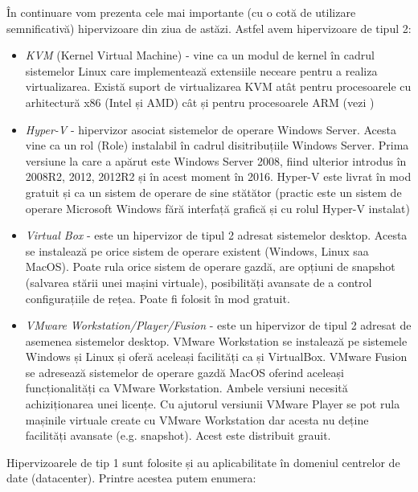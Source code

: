 În continuare vom prezenta cele mai importante (cu o cotă de utilizare
semnificativă) hipervizoare din ziua de astăzi. Astfel avem hipervizoare de
tipul 2:

\begin{itemize}
	\item \textit{KVM} (Kernel Virtual Machine) - vine ca un modul de kernel
		în cadrul sistemelor Linux care implementează extensiile neceare
		pentru a realiza virtualizarea. Există suport de virtualizarea
		KVM atât pentru procesoarele cu arhitectură x86 (Intel și AMD)
		cât și pentru procesoarele ARM (vezi
		)
	\item \textit{Hyper-V} - hipervizor asociat sistemelor de operare
		Windows Server. Acesta vine ca un rol (Role) instalabil în
		cadrul disitribuțiile Windows Server. Prima versiune la care a
		apărut este Windows Server 2008, fiind ulterior introdus în
		2008R2, 2012, 2012R2 și în acest moment în 2016. Hyper-V este
		livrat în mod gratuit și ca un sistem de operare de sine
		stătător (practic este un sistem de operare Microsoft Windows
		fără interfață grafică și cu rolul Hyper-V instalat)
	\item \textit{Virtual Box} - este un hipervizor de tipul 2 adresat
		sistemelor desktop. Acesta se instalează pe orice sistem de
		operare existent (Windows, Linux saa MacOS). Poate rula orice
		sistem de operare gazdă, are opțiuni de snapshot (salvarea
		stării unei mașini virtuale), posibilități avansate de a control
		configurațiile de rețea. Poate fi folosit în mod gratuit.
	\item \textit{VMware Workstation/Player/Fusion} - este un hipervizor de
		tipul 2 adresat de asemenea sistemelor desktop. VMware
		Workstation se instalează pe sistemele Windows și Linux și oferă
		aceleași facilități ca și VirtualBox. VMware Fusion se adresează
		sistemelor de operare gazdă MacOS oferind aceleași
		funcționalități ca VMware Workstation. Ambele versiuni necesită
		achiziționarea unei licențe. Cu ajutorul versiunii VMware Player
		se pot rula mașinile virtuale create cu VMware Workstation dar
		acesta nu deține facilități avansate (e.g. snapshot). Acest este
		distribuit grauit.
\end{itemize}

Hipervizoarele de tip 1 sunt folosite și au aplicabilitate în domeniul centrelor
de date (datacenter). Printre acestea putem enumera:

